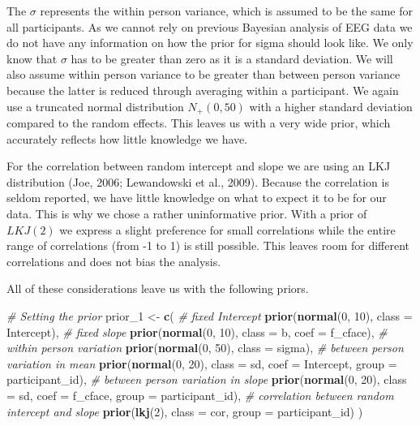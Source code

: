 \documentclass[
  doc,12pt,floatsintext]{apa7}
\newenvironment{Shaded}{\begin{snugshade}}{\end{snugshade}}
\newcommand{\AttributeTok}[1]{\textcolor[rgb]{0.13,0.29,0.53}{#1}}
\newcommand{\CommentTok}[1]{\textcolor[rgb]{0.56,0.35,0.01}{\textit{#1}}}
\newcommand{\DecValTok}[1]{\textcolor[rgb]{0.00,0.00,0.81}{#1}}
\newcommand{\FunctionTok}[1]{\textcolor[rgb]{0.13,0.29,0.53}{\textbf{#1}}}
\newcommand{\NormalTok}[1]{#1}
\newcommand{\OtherTok}[1]{\textcolor[rgb]{0.56,0.35,0.01}{#1}}
\begin{document}
The \(\sigma\) represents the within person variance, which is assumed to be the same for all participants. As we cannot rely on previous Bayesian analysis of EEG data we do not have any information on how the prior for sigma should look like. We only know that \(\sigma\) has to be greater than zero as it is a standard deviation. We will also assume within person variance to be greater than between person variance because the latter is reduced through averaging within a participant. We again use a truncated normal distribution \(N_+(0, 50)\) with a higher standard deviation compared to the random effects. This leaves us with a very wide prior, which accurately reflects how little knowledge we have.

For the correlation between random intercept and slope we are using an LKJ distribution (Joe, 2006; Lewandowski et al., 2009). Because the correlation is seldom reported, we have little knowledge on what to expect it to be for our data. This is why we chose a rather uninformative prior. With a prior of \(LKJ(2)\) we express a slight preference for small correlations while the entire range of correlations (from -1 to 1) is still possible. This leaves room for different correlations and does not bias the analysis.

All of these considerations leave us with the following priors.

\begin{Shaded}
\begin{Highlighting}[]
\CommentTok{\# Setting the prior}
\NormalTok{prior\_1 }\OtherTok{\textless{}{-}} \FunctionTok{c}\NormalTok{(}
  \CommentTok{\# fixed Intercept}
  \FunctionTok{prior}\NormalTok{(}\FunctionTok{normal}\NormalTok{(}\DecValTok{0}\NormalTok{, }\DecValTok{10}\NormalTok{), }\AttributeTok{class =}\NormalTok{ Intercept), }
  \CommentTok{\# fixed slope}
  \FunctionTok{prior}\NormalTok{(}\FunctionTok{normal}\NormalTok{(}\DecValTok{0}\NormalTok{, }\DecValTok{10}\NormalTok{), }\AttributeTok{class =}\NormalTok{ b, }\AttributeTok{coef =}\NormalTok{ f\_cface), }
  \CommentTok{\# within person variation}
  \FunctionTok{prior}\NormalTok{(}\FunctionTok{normal}\NormalTok{(}\DecValTok{0}\NormalTok{, }\DecValTok{50}\NormalTok{), }\AttributeTok{class =}\NormalTok{ sigma), }
  \CommentTok{\# between person variation in mean}
  \FunctionTok{prior}\NormalTok{(}\FunctionTok{normal}\NormalTok{(}\DecValTok{0}\NormalTok{, }\DecValTok{20}\NormalTok{), }\AttributeTok{class =}\NormalTok{ sd, }\AttributeTok{coef =}\NormalTok{ Intercept, }
        \AttributeTok{group =}\NormalTok{ participant\_id), }
  \CommentTok{\# between person variation in slope}
  \FunctionTok{prior}\NormalTok{(}\FunctionTok{normal}\NormalTok{(}\DecValTok{0}\NormalTok{, }\DecValTok{20}\NormalTok{), }\AttributeTok{class =}\NormalTok{ sd, }\AttributeTok{coef =}\NormalTok{ f\_cface, }
        \AttributeTok{group =}\NormalTok{ participant\_id), }
  \CommentTok{\# correlation between random intercept and slope}
  \FunctionTok{prior}\NormalTok{(}\FunctionTok{lkj}\NormalTok{(}\DecValTok{2}\NormalTok{), }\AttributeTok{class =}\NormalTok{ cor, }\AttributeTok{group =}\NormalTok{ participant\_id)}
\NormalTok{) }
\end{Highlighting}
\end{Shaded}
\end{document}
